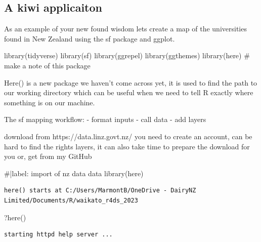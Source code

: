 \documentclass[
  letterpaper,
  DIV=11,
  numbers=noendperiod]{scrartcl}
\newenvironment{Shaded}{\begin{snugshade}}{\end{snugshade}}
\newcommand{\CommentTok}[1]{\textcolor[rgb]{0.37,0.37,0.37}{#1}}
\newcommand{\FunctionTok}[1]{\textcolor[rgb]{0.28,0.35,0.67}{#1}}
\newcommand{\NormalTok}[1]{\textcolor[rgb]{0.00,0.23,0.31}{#1}}
\begin{document}
\hypertarget{a-kiwi-applicaiton}{%
\subsection{A kiwi applicaiton}\label{a-kiwi-applicaiton}}

As an example of your new found wisdom lets create a map of the
universities found in New Zealand using the sf package and ggplot.

\begin{Shaded}
\begin{Highlighting}[]
\FunctionTok{library}\NormalTok{(tidyverse)}
\FunctionTok{library}\NormalTok{(sf)}
\FunctionTok{library}\NormalTok{(ggrepel)}
\FunctionTok{library}\NormalTok{(ggthemes)}
\FunctionTok{library}\NormalTok{(here) }\CommentTok{\# make a note of this package}
\end{Highlighting}
\end{Shaded}

Here() is a new package we haven't come across yet, it is used to find
the path to our working directory which can be useful when we need to
tell R exactly where something is on our machine.

The sf mapping workflow: - format inputs - call data - add layers

download from https://data.linz.govt.nz/ you need to create an account,
can be hard to find the rights layers, it can also take time to prepare
the download for you or, get from my GitHub

\begin{Shaded}
\begin{Highlighting}[]
\CommentTok{\#|label: import of nz data data}
\FunctionTok{library}\NormalTok{(here)}
\end{Highlighting}
\end{Shaded}

\begin{verbatim}
here() starts at C:/Users/MarmontB/OneDrive - DairyNZ Limited/Documents/R/waikato_r4ds_2023
\end{verbatim}

\begin{Shaded}
\begin{Highlighting}[]
\NormalTok{?}\FunctionTok{here}\NormalTok{()}
\end{Highlighting}
\end{Shaded}

\begin{verbatim}
starting httpd help server ...
\end{verbatim}
\end{document}
